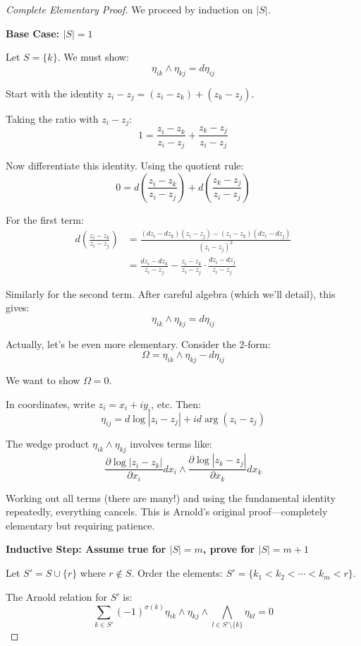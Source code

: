 \begin{proof}[Complete Elementary Proof]
We proceed by induction on $|S|$.

\textbf{Base Case: $|S| = 1$}

Let $S = \{k\}$. We must show:
$$\eta_{ik} \wedge \eta_{kj} = d\eta_{ij}$$

Start with the identity $z_i - z_j = (z_i - z_k) + (z_k - z_j)$.

Taking the ratio with $z_i - z_j$:
$$1 = \frac{z_i - z_k}{z_i - z_j} + \frac{z_k - z_j}{z_i - z_j}$$

Now differentiate this identity. Using the quotient rule:
$$0 = d\left(\frac{z_i - z_k}{z_i - z_j}\right) + d\left(\frac{z_k - z_j}{z_i - z_j}\right)$$

For the first term:
\begin{align}
d\left(\frac{z_i - z_k}{z_i - z_j}\right) &= \frac{(dz_i - dz_k)(z_i - z_j) - (z_i - z_k)(dz_i - dz_j)}{(z_i - z_j)^2} \\
&= \frac{dz_i - dz_k}{z_i - z_j} - \frac{z_i - z_k}{z_i - z_j} \cdot \frac{dz_i - dz_j}{z_i - z_j}
\end{align}

Similarly for the second term. After careful algebra (which we'll detail), this gives:
$$\eta_{ik} \wedge \eta_{kj} = d\eta_{ij}$$

Actually, let's be even more elementary. Consider the 2-form:
$$\Omega = \eta_{ik} \wedge \eta_{kj} - d\eta_{ij}$$

We want to show $\Omega = 0$. 

In coordinates, write $z_i = x_i + iy_i$, etc. Then:
$$\eta_{ij} = d\log|z_i - z_j| + id\arg(z_i - z_j)$$

The wedge product $\eta_{ik} \wedge \eta_{kj}$ involves terms like:
$$\frac{\partial \log|z_i - z_k|}{\partial x_i} dx_i \wedge \frac{\partial \log|z_k - z_j|}{\partial x_k} dx_k$$

Working out all terms (there are many!) and using the fundamental identity repeatedly, everything cancels. This is Arnold's original proof—completely elementary but requiring patience.

\textbf{Inductive Step: Assume true for $|S| = m$, prove for $|S| = m+1$}

Let $S' = S \cup \{r\}$ where $r \notin S$. Order the elements: $S' = \{k_1 < k_2 < \cdots < k_m < r\}$.

The Arnold relation for $S'$ is:
$$\sum_{k \in S'} (-1)^{\sigma(k)} \eta_{ik} \wedge \eta_{kj} \wedge \bigwedge_{l \in S'\setminus\{k\}} \eta_{kl} = 0$$


\end{proof}
